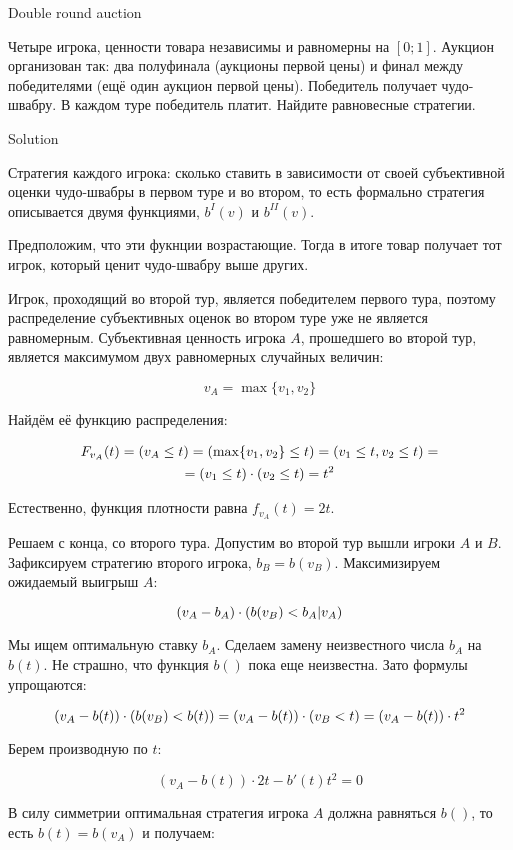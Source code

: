 \documentclass[10pt,a4paper]{article}
\let\P\relax
\DeclareMathOperator{\P}{\mathbb{P}}
\begin{document}
Double round auction

Четыре игрока, ценности товара независимы и равномерны на $[0;1]$. Аукцион организован так: два полуфинала (аукционы первой цены) и финал между победителями (ещё один аукцион первой цены). Победитель получает чудо-швабру. В каждом туре победитель платит. Найдите равновесные стратегии.

Solution 

Стратегия каждого игрока: сколько ставить в зависимости от своей субъективной оценки чудо-швабры в первом туре и во втором, то есть формально стратегия описывается двумя функциями, $b^{I}(v)$ и $b^{II}(v)$.

Предположим, что эти фукнции возрастающие. Тогда в итоге товар получает тот игрок, который ценит чудо-швабру выше других. 

Игрок, проходящий во второй тур, является победителем первого тура, поэтому распределение субъективных оценок во втором туре уже не является равномерным. Субъективная ценность игрока $A$, прошедшего во второй тур, является максимумом двух равномерных случайных величин:

\[
v_A=\max\{v_1,v_2\}
\] 

Найдём её функцию распределения:

\begin{multline}
F_{v_A}(t)=\P(v_A \leq t)=\P(\max\{v_1,v_2\} \leq t)=\P(v_1 \leq t, v_2 \leq t)=\\
=\P(v_1 \leq t)\cdot \P(v_2 \leq t)=t^2
\end{multline}

Естественно, функция плотности равна $f_{v_A}(t)=2t$.

Решаем с конца, со второго тура. Допустим во второй тур вышли игроки $A$ и $B$. Зафиксируем стратегию второго игрока, $b_B=b(v_B)$. Максимизируем ожидаемый выигрыш $A$:

\[
(v_A-b_A)\cdot \P(b(v_B) < b_A | v_A) 
\]

Мы ищем оптимальную ставку $b_A$. Сделаем замену неизвестного числа $b_A$ на $b(t)$. Не страшно, что функция $b()$ пока еще неизвестна. Зато формулы упрощаются:

\[
(v_A-b(t))\cdot  \P(b(v_B) < b(t))=(v_A - b(t))\cdot \P( v_B < t)=(v_A - b(t))\cdot t^2
\]

Берем производную по $t$:

\[
(v_A-b(t)) \cdot 2t - b'(t) t^2=0
\]

В силу симметрии оптимальная стратегия игрока $A$ должна равняться $b()$, то есть $b(t)=b(v_A)$ и получаем:
\end{document}

